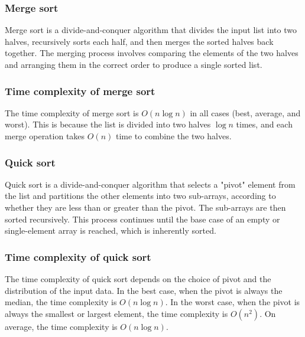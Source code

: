 \documentclass[xcolor=dvipsnames]{beamer}
\begin{document}
    \begin{frame}
        \frametitle{Merge sort}
        Merge sort is a divide-and-conquer algorithm that divides the input list into two halves, recursively sorts each half, and then merges the sorted halves back together. The merging process involves comparing the elements of the two halves and arranging them in the correct order to produce a single sorted list.\\
    \end{frame}
    \begin{frame}
        \frametitle{Time complexity of merge sort}
        The time complexity of merge sort is $O(n \log n)$ in all cases (best, average, and worst). This is because the list is divided into two halves $\log n$ times, and each merge operation takes $O(n)$ time to combine the two halves.
    \end{frame}
    \begin{frame}
        \frametitle{Quick sort}
        Quick sort is a divide-and-conquer algorithm that selects a "pivot" element from the list and partitions the other elements into two sub-arrays, according to whether they are less than or greater than the pivot. The sub-arrays are then sorted recursively. This process continues until the base case of an empty or single-element array is reached, which is inherently sorted.\\
    \end{frame}
    \begin{frame}
        \frametitle{Time complexity of quick sort}
        The time complexity of quick sort depends on the choice of pivot and the distribution of the input data. In the best case, when the pivot is always the median, the time complexity is $O(n \log n)$. In the worst case, when the pivot is always the smallest or largest element, the time complexity is $O(n^2)$. On average, the time complexity is $O(n \log n)$.
    \end{frame}
\end{document}
